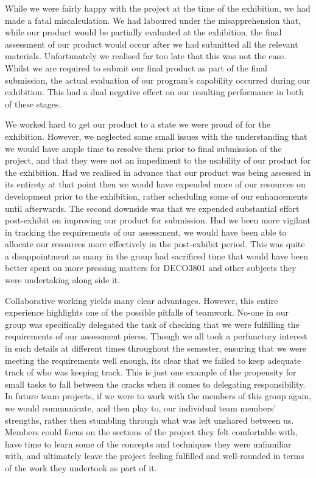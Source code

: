 \documentclass[10pt]{article}
\begin{document}
While we were fairly happy with the project at the time of the exhibition, we had made a fatal miscalculation. We had laboured under the misapprehension that, while our product would be partially evaluated at the exhibition, the final assessment of our product would occur after we had submitted all the relevant materials. Unfortunately we realised far too late that this was not the case. Whilst we are required to submit our final product as part of the final submission, the actual evaluation of our program's capability occurred during our exhibition. This had a dual negative effect on our resulting performance in both of these stages. 

We worked hard to get our product to a state we were proud of for the exhibition. However, we neglected some small issues with the understanding that we would have ample time to resolve them prior to final submission of the project, and that they were not an impediment to the usability of our product for the exhibition. Had we realised in advance that our product was being assessed in its entirety at that point then we would have expended more of our resources on development prior to the exhibition, rather scheduling some of our enhancements until afterwards. The second downside was that we expended substantial effort post-exhibit on improving our product for submission. Had we been more vigilant in tracking the requirements of our assessment, we would have been able to allocate our resources more effectively in the post-exhibit period. This was quite a disappointment as many in the group had sacrificed time that would have been better spent on more pressing matters for DECO3801 and other subjects they were undertaking along side it.

Collaborative working yields many clear advantages. However, this entire experience highlights one of the possible pitfalls of teamwork. No-one in our group was specifically delegated the task of checking that we were fulfilling the requirements of our assessment pieces. Though we all took a perfunctory interest in such details at different times throughout the semester, ensuring that we were meeting the requirements well enough, its clear that we failed to keep adequate track of who was keeping track. This is just one example of the propensity for small tasks to fall between the cracks when it comes to delegating responsibility. In future team projects, if we were to work with the members of this group again, we would communicate, and then play to, our individual team members' strengths, rather then stumbling through what was left unshared between us. Members could focus on the sections of the project they felt comfortable with, have time to learn some of the concepts and techniques they were unfamiliar with, and ultimately leave the project feeling fulfilled and well-rounded in terms of the work they undertook as part of it.
\end{document}
